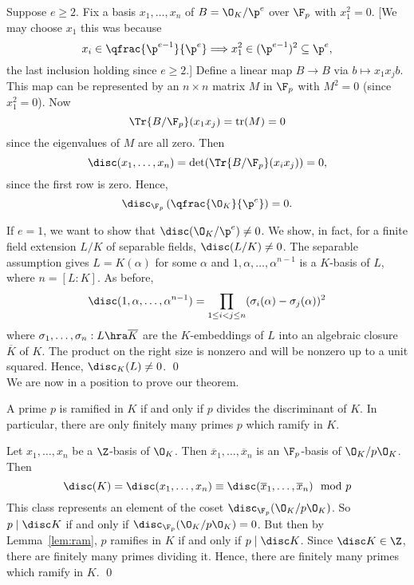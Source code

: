 \pf Suppose $e \geq 2$. Fix a basis $x_1,\ldots,x_n$ of $B=\O_K/\p^e$ over $\F_p$ with $x_1^2=0$. [We may choose $x_1$ this was because
	\[
	x_i \in \qfrac{\p^{e-1}}{\p^e} \Longrightarrow x_1^2 \in (\p^{e-1})^2 \subseteq \p^e,
	\]
the last inclusion holding since $e \geq 2$.] Define a linear map $B \to B$ via $b \mapsto x_1x_jb$. This map can be represented by an $n \times n$ matrix $M$ in $\F_p$ with $M^2=0$ (since $x_1^2=0$). Now
	\[
	\Tr{B/\F_p}(x_1x_j)= \text{tr}(M)=0
	\]
since the eigenvalues of $M$ are all zero. Then
	\[
	\disc(x_1,\ldots,x_n)=\det(\Tr{B/\F_p}(x_ix_j))=0,
	\]
since the first row is zero. Hence,
	\[
	\disc_{\F_p}\left(\qfrac{\O_K}{\p^e}\right)=0.
	\]

If $e=1$, we want to show that $\disc(\O_K/\p^e) \neq 0$. We show, in fact, for a finite field extension $L/K$ of separable fields, $\disc(L/K) \neq 0$. The separable assumption gives $L=K(\alpha)$ for some $\alpha$ and $1,\alpha,\ldots,\alpha^{n-1}$ is a $K$-basis of $L$, where $n=[L \colon K]$. As before,
	\[
	\disc(1,\alpha,\ldots,\alpha^{n-1})= \prod_{1 \leq i < j \leq n} (\sigma_i(\alpha) - \sigma_j(\alpha))^2
	\]
where $\sigma_1,\ldots,\sigma_n: L \hra \overline{K}$ are the $K$-embeddings of $L$ into an algebraic closure $\overline{K}$ of $K$. The product on the right size is nonzero and will be nonzero up to a unit squared. Hence, $\disc_K(L) \neq 0$. \qed \\


We are now in a position to prove our theorem.

\begin{thm}
A prime $p$ is ramified in $K$ if and only if $p$ divides the discriminant of $K$. In particular, there are only finitely many primes $p$ which ramify in $K$. 
\end{thm}

\pf Let $x_1,\ldots,x_n$ be a $\Z$-basis of $\O_K$. Then $\overline{x}_1,\ldots,\overline{x}_n$ is an $\F_p$-basis of $\O_K/p\O_K$. Then
	\[
	\disc(K)= \disc(x_1,\ldots,x_n) \equiv \disc(\overline{x}_1,\ldots,\overline{x}_n) \mod p
	\]
This class represents an element of the coset $\disc_{\F_p}(\O_K/p\O_K)$. So $p \mid \disc K$ if and only if $\disc_{\F_p}(\O_K/p\O_K)=0$. But then by Lemma~\ref{lem:ram}, $p$ ramifies in $K$ if and only if $p \mid \disc K$. Since $\disc K \in \Z$, there are finitely many primes dividing it. Hence, there are finitely many primes which ramify in $K$. \qed \\



